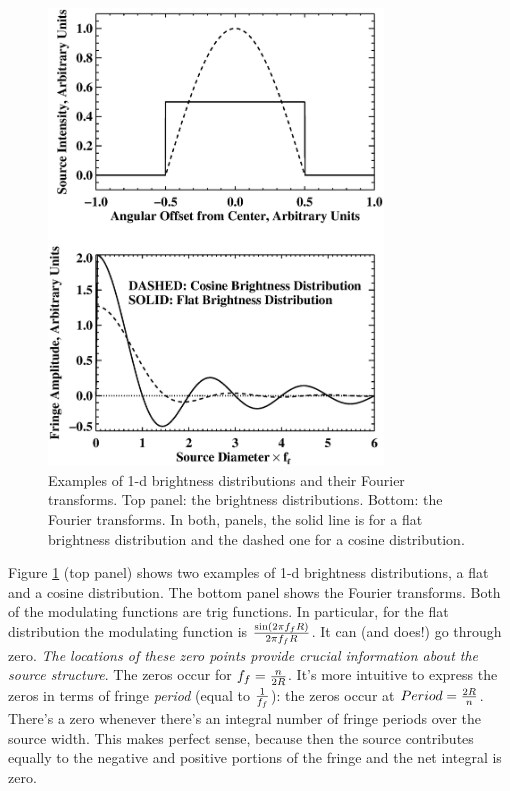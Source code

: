 \documentclass[11pt,preprint]{aastex}
\begin{document}
\begin{figure}[h!]
\begin{center}
\includegraphics[width=3.5in] {cosfringe.ps}
\end{center}
                                                                                
\caption{Examples of 1-d brightness distributions and their Fourier
transforms. Top panel: the brightness distributions. Bottom: the Fourier
transforms. In both, panels, the solid line is for a flat brightness
distribution and the dashed one for a cosine distribution. 
\label{cosfringe} } \end{figure}

Figure \ref{cosfringe} (top panel) shows two examples of 1-d brightness
distributions, a flat and a cosine distribution.  The bottom panel shows
the Fourier transforms.  Both of the modulating functions are trig
functions. In particular, for the flat distribution the modulating
function is ${ \sin(2 \pi f_f R) \over 2 \pi f_f R}$. It can (and does!)
go through zero. {\it The locations of these zero points provide crucial
information about the source structure}. The zeros occur for $f_f={n
\over 2R}$. It's more intuitive to express the zeros in terms of fringe
{\it period} (equal to $1 \over f_f$): the zeros occur at $Period = {2R
\over n}$. There's a zero whenever there's an integral number of fringe
periods over the source width. This makes perfect sense, because then
the source contributes equally to the negative and positive portions of
the fringe and the net integral is zero.
\end{document}
